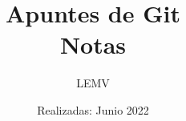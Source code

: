 \documentclass{article}
\title{Apuntes de Git\\
\Large{Notas}}
\author{LEMV}
\date{Realizadas: Junio 2022}
\begin{document}
\renewcommand*\contentsname{Índice}
\renewcommand{\listfigurename}{Índice de figuras}

\maketitle\newpage
\tableofcontents\newpage
\listoffigures\newpage



\end{document}
